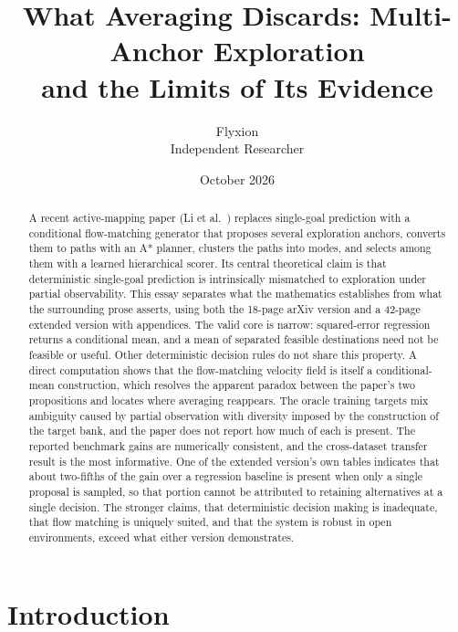 \documentclass[11pt]{article}
\title{What Averaging Discards: Multi-Anchor Exploration\\and the Limits of Its Evidence}
\author{Flyxion\\Independent Researcher}
\date{October 2026}
\theoremstyle{plain}
\theoremstyle{remark}
\begin{document}
\maketitle

\begin{abstract}
A recent active-mapping paper (Li et al.~\cite{li2026roads}) replaces single-goal prediction with a conditional flow-matching generator that proposes several exploration anchors, converts them to paths with an A* planner, clusters the paths into modes, and selects among them with a learned hierarchical scorer. Its central theoretical claim is that deterministic single-goal prediction is intrinsically mismatched to exploration under partial observability. This essay separates what the mathematics establishes from what the surrounding prose asserts, using both the 18-page arXiv version and a 42-page extended version with appendices. The valid core is narrow: squared-error regression returns a conditional mean, and a mean of separated feasible destinations need not be feasible or useful. Other deterministic decision rules do not share this property. A direct computation shows that the flow-matching velocity field is itself a conditional-mean construction, which resolves the apparent paradox between the paper's two propositions and locates where averaging reappears. The oracle training targets mix ambiguity caused by partial observation with diversity imposed by the construction of the target bank, and the paper does not report how much of each is present. The reported benchmark gains are numerically consistent, and the cross-dataset transfer result is the most informative. One of the extended version's own tables indicates that about two-fifths of the gain over a regression baseline is present when only a single proposal is sampled, so that portion cannot be attributed to retaining alternatives at a single decision. The stronger claims, that deterministic decision making is inadequate, that flow matching is uniquely suited, and that the system is robust in open environments, exceed what either version demonstrates.
\end{abstract}

\section{Introduction}
\end{document}
